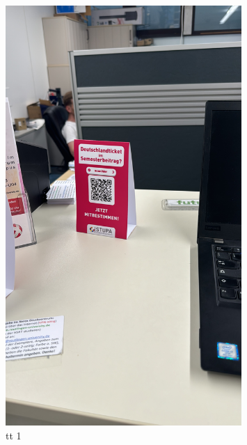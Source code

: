 \begin{multicols}{3}
    \begin{figure}[H]
        \vspace{0.3\textwidth}
        \includegraphics[width=0.8\textwidth, angle =-90]{Content/Images/tabletent.JPG}
        \caption{\gls{tt} 1}
        \label{fig:table-tent}
    \end{figure}
    \columnbreak
    \begin{figure}[H]
        \vspace{0.3\textwidth}

\end{figure}
\end{multicols}
